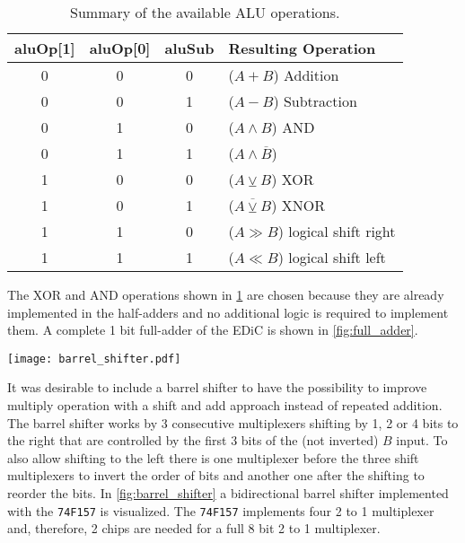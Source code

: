 \begin{table}
  \centering
  \renewcommand{\arraystretch}{1.25}
  \caption{Summary of the available \gls{ALU} operations.}
  \label{tab:aluOp}
  \begin{tabularx}{.8\textwidth}{ |c|c|c||X| }
    \hline
    aluOp[1] & aluOp[0] & aluSub & Resulting Operation             \\\hline\hline
    0        & 0        & 0      & ($A + B$) Addition              \\\hline
    0        & 0        & 1      & ($A - B$) Subtraction           \\\hline
    0        & 1        & 0      & ($A \land B$) AND               \\\hline
    0        & 1        & 1      & ($A \land \overline{B}$)        \\\hline
    1        & 0        & 0      & ($A \veebar B$) XOR             \\\hline
    1        & 0        & 1      & ($\overline{A \veebar B}$) XNOR \\\hline
    1        & 1        & 0      & ($A \gg B$) logical shift right \\\hline
    1        & 1        & 1      & ($A \ll B$) logical shift left  \\\hline
  \end{tabularx}
\end{table}
The XOR and AND operations shown in \cref{tab:aluOp} are chosen because they are already implemented in the half-adders and no additional logic is required to implement them.
A complete 1 bit full-adder of the \gls{EDiC} is shown in \cref{fig:full_adder}.

\begin{sidewaysfigure}[p]
  \centering
  \texttt{[image: barrel\_shifter.pdf]}
  \caption{8 bit bidirectional barrel shifter.}
  \label{fig:barrel_shifter}
\end{sidewaysfigure}
It was desirable to include a barrel shifter to have the possibility to improve multiply operation with a shift and add approach instead of repeated addition.
The barrel shifter works by 3 consecutive multiplexers shifting by 1, 2 or 4 bits to the right that are controlled by the first 3 bits of the (not inverted) $B$ input.
To also allow shifting to the left there is one multiplexer before the three shift multiplexers to invert the order of bits and another one after the shifting to reorder the bits.
In \cref{fig:barrel_shifter} a bidirectional barrel shifter implemented with the \texttt{74F157} is visualized. The \texttt{74F157} implements four 2 to 1 multiplexer and, therefore, 2 chips are needed for a full 8 bit 2 to 1 multiplexer.

